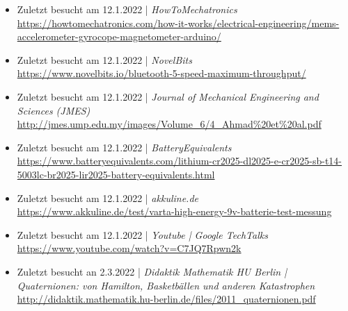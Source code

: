\begin{itemize}
    \item Zuletzt besucht am 12.1.2022 | \textit{HowToMechatronics}\\
        \url{https://howtomechatronics.com/how-it-works/electrical-engineering/mems-accelerometer-gyrocope-magnetometer-arduino/}
    \item Zuletzt besucht am 12.1.2022 | \textit{NovelBits} \\
        \url{https://www.novelbits.io/bluetooth-5-speed-maximum-throughput/}
    \item Zuletzt besucht am 12.1.2022 | \textit{Journal of Mechanical Engineering and Sciences (JMES)} \\
        \url{http://jmes.ump.edu.my/images/Volume_6/4_Ahmad%20et%20al.pdf}
    \item Zuletzt besucht am 12.1.2022 | \textit{BatteryEquivalents}\\
        \url{https://www.batteryequivalents.com/lithium-cr2025-dl2025-e-cr2025-sb-t14-5003lc-br2025-lir2025-battery-equivalents.html}
    \item Zuletzt besucht am 12.1.2022 | \textit{akkuline.de}\\
        \url{https://www.akkuline.de/test/varta-high-energy-9v-batterie-test-messung}
    \item Zuletzt besucht am 12.1.2022 | \textit{Youtube | Google TechTalks} \\
        \url{https://www.youtube.com/watch?v=C7JQ7Rpwn2k}
    \item Zuletzt besucht an 2.3.2022 | \textit{Didaktik Mathematik HU Berlin | Quaternionen: von Hamilton, Basketbällen und anderen Katastrophen}
        \url{http://didaktik.mathematik.hu-berlin.de/files/2011_quaternionen.pdf}
\end{itemize}
